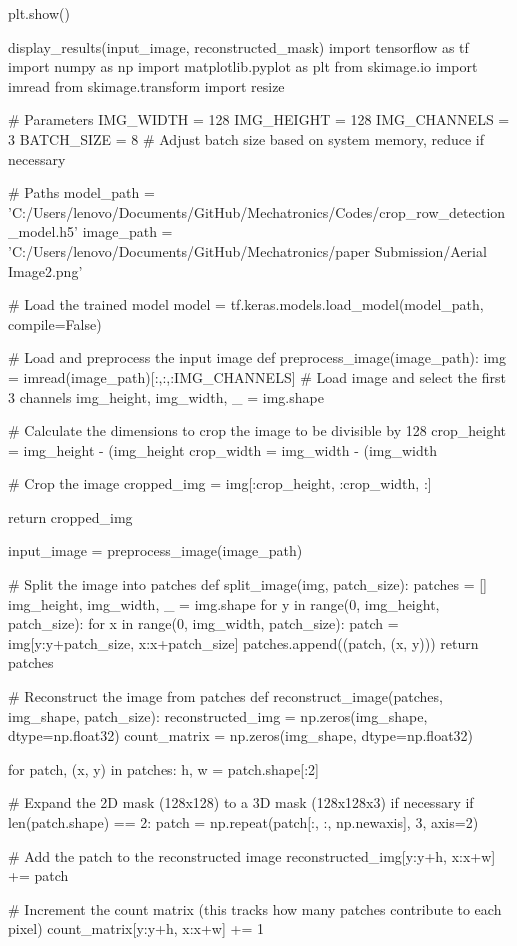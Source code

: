 \documentclass[conference]{IEEEtran}
\begin{document}
plt.show()

display_results(input_image, reconstructed_mask)
import tensorflow as tf
import numpy as np
import matplotlib.pyplot as plt
from skimage.io import imread
from skimage.transform import resize

# Parameters
IMG_WIDTH = 128
IMG_HEIGHT = 128
IMG_CHANNELS = 3
BATCH_SIZE = 8  # Adjust batch size based on system memory, reduce if necessary

# Paths
model_path = 'C:/Users/lenovo/Documents/GitHub/Mechatronics/Codes/crop_row_detection_model.h5'
image_path = 'C:/Users/lenovo/Documents/GitHub/Mechatronics/paper Submission/Aerial Image2.png'

# Load the trained model
model = tf.keras.models.load_model(model_path, compile=False)

# Load and preprocess the input image
def preprocess_image(image_path):
img = imread(image_path)[:,:,:IMG_CHANNELS]  # Load image and select the first 3 channels
img_height, img_width, _ = img.shape

# Calculate the dimensions to crop the image to be divisible by 128
crop_height = img_height - (img_height %
crop_width = img_width - (img_width %

# Crop the image
cropped_img = img[:crop_height, :crop_width, :]

return cropped_img

input_image = preprocess_image(image_path)

# Split the image into patches
def split_image(img, patch_size):
patches = []
img_height, img_width, _ = img.shape
for y in range(0, img_height, patch_size):
for x in range(0, img_width, patch_size):
patch = img[y:y+patch_size, x:x+patch_size]
patches.append((patch, (x, y)))
return patches

# Reconstruct the image from patches
def reconstruct_image(patches, img_shape, patch_size):
reconstructed_img = np.zeros(img_shape, dtype=np.float32)
count_matrix = np.zeros(img_shape, dtype=np.float32)

for patch, (x, y) in patches:
h, w = patch.shape[:2]

# Expand the 2D mask (128x128) to a 3D mask (128x128x3) if necessary
if len(patch.shape) == 2:
patch = np.repeat(patch[:, :, np.newaxis], 3, axis=2)

# Add the patch to the reconstructed image
reconstructed_img[y:y+h, x:x+w] += patch

# Increment the count matrix (this tracks how many patches contribute to each pixel)
count_matrix[y:y+h, x:x+w] += 1
\end{document}
